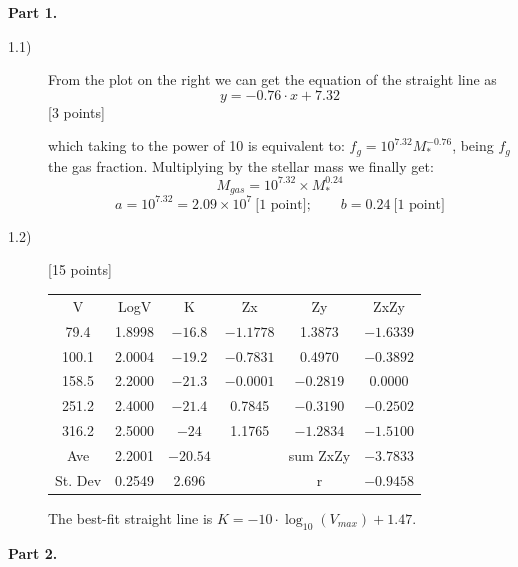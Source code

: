 \textbf{Part 1.}

\begin{description}
\item[1.1)] From the plot on the right we can get the equation of the
  straight line as
  \[ y = -0.76\cdot x + 7.32 \]
  \hfill[3 points]

  which taking to the power of 10 is equivalent to:
  $f_g = 10^{7.32}M_*^{-0.76}$, being $f_g$ the gas fraction. Multiplying
  by the stellar mass we finally get:
  \[ M_{gas} = 10^{7.32}\times M_*^{0.24} \]
  \[ a = 10^{7.32} = 2.09\times 10^{7}\ \text{[1 point]};\qquad
     b = 0.24\ \text{[1 point]} \]

\item[1.2)] \hfill[15 points]

  \begin{center}
  \begin{tabular}{cccccc}
  V & LogV & K & Zx & Zy & ZxZy\\
  79.4 & 1.8998 & $-16.8$ & $-1.1778$ & 1.3873 & $-1.6339$\\
  100.1 & 2.0004 & $-19.2$ & $-0.7831$ & 0.4970 & $-0.3892$\\
  158.5 & 2.2000 & $-21.3$ & $-0.0001$ & $-0.2819$ & 0.0000\\
  251.2 & 2.4000 & $-21.4$ & 0.7845 & $-0.3190$ & $-0.2502$\\
  316.2 & 2.5000 & $-24$ & 1.1765 & $-1.2834$ & $-1.5100$\\
  \hline
  Ave & 2.2001 & $-20.54$ & & sum ZxZy & $-3.7833$\\
  St. Dev & 0.2549 & 2.696 & & r & $-0.9458$
  \end{tabular}
  \end{center}

  The best-fit straight line is
  $K = -10\cdot\log_{10}(V_{max}) + 1.47$.
\end{description}

\textbf{Part 2.}

